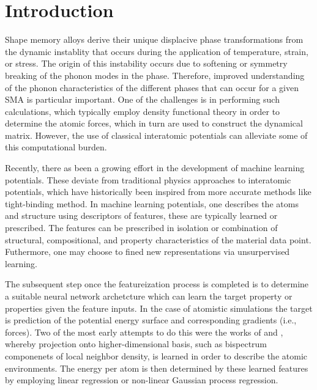 \documentclass[preprint]{elsarticle}
\begin{document}
\section{Introduction}
\label{sec:intro}
Shape memory alloys derive their unique displacive phase transformations from the dynamic instablity that occurs during the application of temperature, strain, or stress. The origin of this instability occurs due to softening or symmetry breaking of the phonon modes in the phase. Therefore, improved understanding of the phonon characteristics of the different phases that can occur for a given SMA is particular important. One of the challenges is in performing such calculations, which typically employ density functional theory in order to determine the atomic forces, which in turn are used to construct the dynamical matrix. However, the use of classical interatomic potentials can alleviate some of this computational burden. \par

Recently, there as been a growing effort in the development of machine learning potentials. These deviate from traditional physics approaches to interatomic potentials, which have historically been inspired from more accurate methods like tight-binding method. In machine learning potentials, one describes the atoms and structure using descriptors of features, these are typically learned or prescribed. The features can be prescribed in isolation or combination of  structural, compositional, and property characteristics of the material data point. Futhermore, one may choose to fined new representations via unsurpervised learning. \par

The subsequent step once the featureization process is completed is to determine a suitable neural network archetcture which can learn the target property or properties given the feature inputs. In the case of atomistic simulations the target is prediction of the potential energy surface and corresponding gradients (i.e., forces). Two of the most early attempts to do this were the works of \citet{Bartok2010} and \citet{Thompson2015}, whereby projection onto higher-dimensional basis, such as bispectrum componenets of local neighbor density, is learned in order to describe the atomic environments. The energy per atom is then determined by these learned features by employing linear regression or non-linear Gaussian process regression. \par
\end{document}

